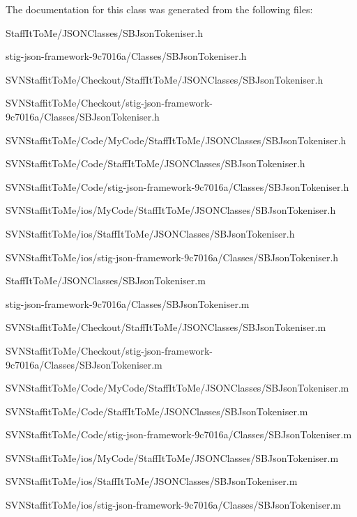 \-The documentation for this class was generated from the following files\-:\begin{DoxyCompactItemize}
\item 
\-Staff\-It\-To\-Me/\-J\-S\-O\-N\-Classes/\-S\-B\-Json\-Tokeniser.\-h\item 
stig-\/json-\/framework-\/9c7016a/\-Classes/\-S\-B\-Json\-Tokeniser.\-h\item 
\-S\-V\-N\-Staffit\-To\-Me/\-Checkout/\-Staff\-It\-To\-Me/\-J\-S\-O\-N\-Classes/\-S\-B\-Json\-Tokeniser.\-h\item 
\-S\-V\-N\-Staffit\-To\-Me/\-Checkout/stig-\/json-\/framework-\/9c7016a/\-Classes/\-S\-B\-Json\-Tokeniser.\-h\item 
\-S\-V\-N\-Staffit\-To\-Me/\-Code/\-My\-Code/\-Staff\-It\-To\-Me/\-J\-S\-O\-N\-Classes/\-S\-B\-Json\-Tokeniser.\-h\item 
\-S\-V\-N\-Staffit\-To\-Me/\-Code/\-Staff\-It\-To\-Me/\-J\-S\-O\-N\-Classes/\-S\-B\-Json\-Tokeniser.\-h\item 
\-S\-V\-N\-Staffit\-To\-Me/\-Code/stig-\/json-\/framework-\/9c7016a/\-Classes/\-S\-B\-Json\-Tokeniser.\-h\item 
\-S\-V\-N\-Staffit\-To\-Me/ios/\-My\-Code/\-Staff\-It\-To\-Me/\-J\-S\-O\-N\-Classes/\-S\-B\-Json\-Tokeniser.\-h\item 
\-S\-V\-N\-Staffit\-To\-Me/ios/\-Staff\-It\-To\-Me/\-J\-S\-O\-N\-Classes/\-S\-B\-Json\-Tokeniser.\-h\item 
\-S\-V\-N\-Staffit\-To\-Me/ios/stig-\/json-\/framework-\/9c7016a/\-Classes/\-S\-B\-Json\-Tokeniser.\-h\item 
\-Staff\-It\-To\-Me/\-J\-S\-O\-N\-Classes/\-S\-B\-Json\-Tokeniser.\-m\item 
stig-\/json-\/framework-\/9c7016a/\-Classes/\-S\-B\-Json\-Tokeniser.\-m\item 
\-S\-V\-N\-Staffit\-To\-Me/\-Checkout/\-Staff\-It\-To\-Me/\-J\-S\-O\-N\-Classes/\-S\-B\-Json\-Tokeniser.\-m\item 
\-S\-V\-N\-Staffit\-To\-Me/\-Checkout/stig-\/json-\/framework-\/9c7016a/\-Classes/\-S\-B\-Json\-Tokeniser.\-m\item 
\-S\-V\-N\-Staffit\-To\-Me/\-Code/\-My\-Code/\-Staff\-It\-To\-Me/\-J\-S\-O\-N\-Classes/\-S\-B\-Json\-Tokeniser.\-m\item 
\-S\-V\-N\-Staffit\-To\-Me/\-Code/\-Staff\-It\-To\-Me/\-J\-S\-O\-N\-Classes/\-S\-B\-Json\-Tokeniser.\-m\item 
\-S\-V\-N\-Staffit\-To\-Me/\-Code/stig-\/json-\/framework-\/9c7016a/\-Classes/\-S\-B\-Json\-Tokeniser.\-m\item 
\-S\-V\-N\-Staffit\-To\-Me/ios/\-My\-Code/\-Staff\-It\-To\-Me/\-J\-S\-O\-N\-Classes/\-S\-B\-Json\-Tokeniser.\-m\item 
\-S\-V\-N\-Staffit\-To\-Me/ios/\-Staff\-It\-To\-Me/\-J\-S\-O\-N\-Classes/\-S\-B\-Json\-Tokeniser.\-m\item 
\-S\-V\-N\-Staffit\-To\-Me/ios/stig-\/json-\/framework-\/9c7016a/\-Classes/\-S\-B\-Json\-Tokeniser.\-m\end{DoxyCompactItemize}
